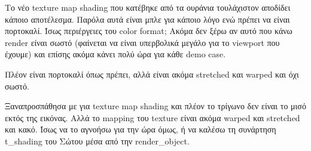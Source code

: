 \documentclass{article}
\begin{document}
Το νέο texture map shading που κατέβηκε από τα ουράνια τουλάχιστον
αποδίδει κάποιο αποτέλεσμα. Παρόλα αυτά είναι μπλε για κάποιο λόγο
ενώ πρέπει να είναι πορτοκαλί. Ίσως περιέργειες του color format;
Ακόμα δεν ξέρω αν αυτό που κάνω render είναι σωστό (φαίνεται να 
είναι υπερβολικά μεγάλο για το viewport που έχουμε) και επίσης ακόμα 
κάνει πολύ ώρα για κάθε demo case.

Πλέον είναι πορτοκαλί όπως πρέπει, αλλά είναι ακόμα stretched 
και warped και όχι σωστό.

Ξαναπροσπάθησα με για texture map shading και πλέον το τρίγωνο δεν είναι 
το μισό εκτός της εικόνας. Αλλά το mapping του texture είναι ακόμα 
warped και stretched και κακό. Ίσως να το αγνοήσω για την ώρα όμως,
ή να καλέσω τη συνάρτηση t\_shading του Σώτου μέσα από την render\_object.
\end{document}
